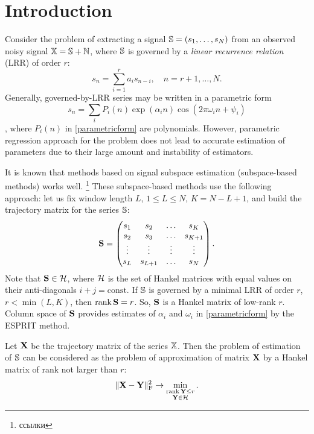 \documentclass[12pt,a4paper,fleqn,leqno]{article}
\def\rank{\mathop{\mathrm{rank}}}
\begin{document}
\section{Introduction}
Consider the problem of extracting a signal $\mathbb{S} = (s_1, \ldots, s_N)$ from an observed noisy signal $\mathbb{X} = \mathbb{S} + \mathbb{N}$, where $\mathbb{S}$ is governed by a \emph{linear recurrence relation} (LRR) of order $r$:
\begin{equation*}
s_n = \sum_{i = 1}^{r} a_i s_{n-i}, \quad n = r + 1, \ldots, N.
\end{equation*}
Generally, governed-by-LRR series may be written in a parametric form 
\begin{equation} \label{parametricform}
s_n = \sum_i P_i(n) \exp(\alpha_i n) \cos(2 \pi \omega_i n + \psi_i)
\end{equation}, where $P_i(n)$ in \eqref{parametricform} are polynomials. However, parametric regression approach for the problem does not lead to accurate estimation of parameters due to their large amount and instability of estimators.

It is known that methods based on signal subspace estimation (subspace-based methods) works well. \footnote{ссылки} These subspace-based methods use the following approach: let us fix window length $L$, $1 \le L \le N$, $K = N - L + 1$, and build the trajectory matrix for the series $\mathbb{S}$:
\begin{equation*}
\mathbf{S} = \begin{pmatrix}
s_1 & s_2 & \ldots & s_K \\
s_2 & s_3 & \ldots & s_{K + 1} \\
\vdots & \vdots & \vdots & \vdots \\
s_L & s_{L + 1} & \ldots & s_N
\end{pmatrix}.
\end{equation*}
Note that $\mathbf{S}\in \mathcal{H}$, where $\mathcal{H}$ is the set of Hankel matrices with equal values on their anti-diagonals $i+j=\mathrm{const}$.
If $\mathbb{S}$ is governed by a minimal LRR of order $r$, $r < \min(L, K)$, then $\rank \bfS = r$. So, $\mathbf{S}$ is a Hankel matrix of low-rank $r$. Column space of $\mathbf{S}$ provides estimates of $\alpha_i$ and $\omega_i$ in \eqref{parametricform} by the ESPRIT method.

Let $\mathbf{X}$ be the trajectory matrix of the series $\mathbb{X}$. Then the problem of estimation of $\mathbb{S}$ can be considered as the problem of approximation of matrix $\mathbf{X}$ by a Hankel matrix of rank not larger than $r$:
\begin{equation}\label{introd_task}
\|\bfX - \bfY\|^2_\rmF \to \min_{\substack{\rank \bfY \le r \\ \bfY \in \calH}}.
\end{equation}
\end{document}
